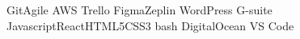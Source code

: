 

\begin{cvskills}
    \cvskill
    {\raisebox{\normalbaselineskip}{Technologies}}{
        Git{\enskip\cdotp\enskip}Agile
        {\enskip\cdotp\enskip}AWS
        {\enskip\cdotp\enskip}Trello
        {\enskip\cdotp\enskip}Figma{\enskip\cdotp\enskip}Zeplin
        {\enskip\cdotp\enskip}WordPress
        {\enskip\cdotp\enskip}G-suite
         \newline
         Javascript{\enskip\cdotp\enskip}React{\enskip\cdotp\enskip}HTML5{\enskip\cdotp\enskip}CSS3
         {\enskip\cdotp\enskip}bash
         {\enskip\cdotp\enskip}DigitalOcean
         {\enskip\cdotp\enskip}VS Code
    }
    
\end{cvskills}
